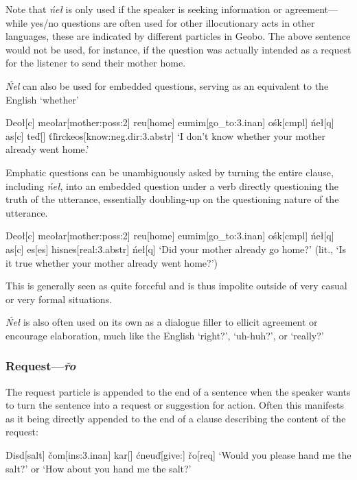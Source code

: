 \documentclass[a4paper,11pt,oneside,openany]{memoir}
\newcommand{\vt}{ť}
\newcommand{\vd}{ď}
\newcommand{\vc}{č}
\newcommand{\vr}{ř}
\newcommand{\vl}{ľ}
\begin{document}
Note that \textit{\'ne\l} is only used if the speaker is seeking information or agreement---while yes/no questions are often used for other illocutionary acts in other languages, these are indicated by different particles in Geobo{\engma}. The above sentence would not be used, for instance, if the question was actually intended as a request for the listener to send their mother home.

\textit{\'Nel} can also be used for embedded questions, serving as an equivalent to the English `whether'

\ex
\begingl
Deo\l[\sc c]
meo\l ar[mother:{\sc poss:2}]
reu[home]
eumim[go\_to:{\sc 3.inan}]
o\'sk[\sc cmpl]
\'ne\l[\sc q]
\nogloss{,}
as[\sc c]
te\vd[]
\vt\vl irckeos[know:{\sc neg.dir:3.abstr}]
\glft `I don't know whether your mother already went home.'
\endgl
\xe

Emphatic questions can be unambiguously asked by turning the entire clause, including \textit{\'ne\l}, into an embedded question under a verb directly questioning the truth of the utterance, essentially doubling-up on the questioning nature of the utterance.

\ex
\begingl
Deo\l[\sc c]
meo\l ar[mother:{\sc poss:2}]
reu[home]
eumim[go\_to:{\sc 3.inan}]
o\'sk[\sc cmpl]
\'ne\l[\sc q]
\nogloss{,}
as[\sc c]
es[\sc es]
hisnes[real:{\sc 3.abstr}]
\'ne\l[\sc q]
\glft `Did your mother already go home?' (lit., `Is it true whether your mother already went home?')
\endgl 
\xe

This is generally seen as quite forceful and is thus impolite outside of very casual or very formal situations.

\textit{\'Ne\l} is also often used on its own as a dialogue filler to ellicit agreement or encourage elaboration, much like the English `right?', `uh-huh?', or `really?'

\subsubsection{Request---\textit{\vr o}}\label{sec:ro}

The request particle is appended to the end of a sentence when the speaker wants to turn the sentence into a request or suggestion for action. Often this manifests as it being directly appended to the end of a clause describing the content of the request:

\ex
\begingl
Disd[salt]
\vc om[\sc ins:3.inan]
kar[]
\'cneu\vd[give:{}]
\vr o[\sc req]
\glft `Would you please hand me the salt?' or `How about you hand me the salt?'
\endgl
\xe
\end{document}
